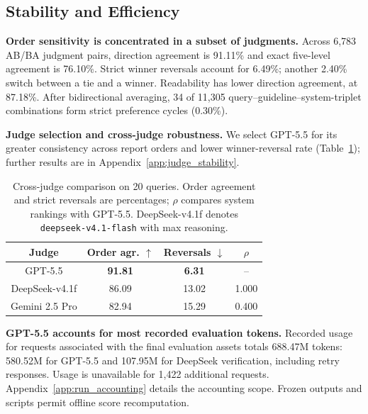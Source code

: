 \documentclass{article}
\begin{document}
\subsection{Stability and Efficiency}
\label{sec:judge_stability}
\label{sec:cost}
\textbf{Order sensitivity is concentrated in a subset of judgments.}
Across 6,783 AB/BA judgment pairs, direction agreement is 91.11\% and exact five-level agreement is 76.10\%. Strict winner reversals account for 6.49\%; another 2.40\% switch between a tie and a winner. Readability has lower direction agreement, at 87.18\%. After bidirectional averaging, 34 of 11,305 query--guideline--system-triplet combinations form strict preference cycles (0.30\%). 

\textbf{Judge selection and cross-judge robustness.}
We select GPT-5.5 for its greater consistency across report orders and lower winner-reversal rate (Table~\ref{tab:judge-selection}); further results are in Appendix~\ref{app:judge_stability}.

\begin{table}[!t]
\centering
\small
\setlength{\tabcolsep}{4pt}
\begin{tabular}{@{}cccc@{}}
\toprule
Judge & Order agr. $\uparrow$ & Reversals $\downarrow$ & $\rho$ \\
\midrule
GPT-5.5 & \textbf{91.81} & \textbf{6.31} & -- \\
DeepSeek-v4.1f & 86.09 & 13.02 & 1.000 \\
Gemini 2.5 Pro & 82.94 & 15.29 & 0.400 \\
\bottomrule
\end{tabular}
\caption{Cross-judge comparison on 20 queries. Order agreement and strict reversals are percentages; $\rho$ compares system rankings with GPT-5.5. DeepSeek-v4.1f denotes \texttt{deepseek-v4.1-flash} with max reasoning.}
\label{tab:judge-selection}
\end{table}

\textbf{GPT-5.5 accounts for most recorded evaluation tokens.}
Recorded usage for requests associated with the final evaluation assets totals 688.47M tokens: 580.52M for GPT-5.5 and 107.95M for DeepSeek verification, including retry responses. Usage is unavailable for 1,422 additional requests. Appendix~\ref{app:run_accounting} details the accounting scope. Frozen outputs and scripts permit offline score recomputation.
\end{document}
